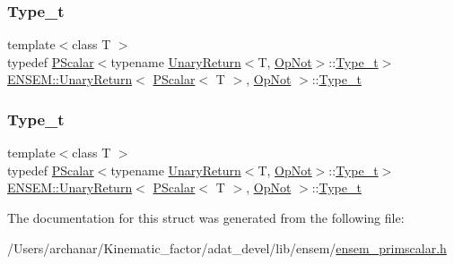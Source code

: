 \subsubsection{\texorpdfstring{Type\_t}{Type\_t}\hspace{0.1cm}{\footnotesize\ttfamily [1/2]}}
{\footnotesize\ttfamily template$<$class T $>$ \\
typedef \mbox{\hyperlink{classENSEM_1_1PScalar}{P\+Scalar}}$<$typename \mbox{\hyperlink{structENSEM_1_1UnaryReturn}{Unary\+Return}}$<$T, \mbox{\hyperlink{structENSEM_1_1OpNot}{Op\+Not}}$>$\+::\mbox{\hyperlink{structENSEM_1_1UnaryReturn_3_01PScalar_3_01T_01_4_00_01OpNot_01_4_a7612702a79b74f223457b785dbd77b2b}{Type\+\_\+t}}$>$ \mbox{\hyperlink{structENSEM_1_1UnaryReturn}{E\+N\+S\+E\+M\+::\+Unary\+Return}}$<$ \mbox{\hyperlink{classENSEM_1_1PScalar}{P\+Scalar}}$<$ T $>$, \mbox{\hyperlink{structENSEM_1_1OpNot}{Op\+Not}} $>$\+::\mbox{\hyperlink{structENSEM_1_1UnaryReturn_3_01PScalar_3_01T_01_4_00_01OpNot_01_4_a7612702a79b74f223457b785dbd77b2b}{Type\+\_\+t}}}

\mbox{\label{structENSEM_1_1UnaryReturn_3_01PScalar_3_01T_01_4_00_01OpNot_01_4_a7612702a79b74f223457b785dbd77b2b}} 
\subsubsection{\texorpdfstring{Type\_t}{Type\_t}\hspace{0.1cm}{\footnotesize\ttfamily [2/2]}}
{\footnotesize\ttfamily template$<$class T $>$ \\
typedef \mbox{\hyperlink{classENSEM_1_1PScalar}{P\+Scalar}}$<$typename \mbox{\hyperlink{structENSEM_1_1UnaryReturn}{Unary\+Return}}$<$T, \mbox{\hyperlink{structENSEM_1_1OpNot}{Op\+Not}}$>$\+::\mbox{\hyperlink{structENSEM_1_1UnaryReturn_3_01PScalar_3_01T_01_4_00_01OpNot_01_4_a7612702a79b74f223457b785dbd77b2b}{Type\+\_\+t}}$>$ \mbox{\hyperlink{structENSEM_1_1UnaryReturn}{E\+N\+S\+E\+M\+::\+Unary\+Return}}$<$ \mbox{\hyperlink{classENSEM_1_1PScalar}{P\+Scalar}}$<$ T $>$, \mbox{\hyperlink{structENSEM_1_1OpNot}{Op\+Not}} $>$\+::\mbox{\hyperlink{structENSEM_1_1UnaryReturn_3_01PScalar_3_01T_01_4_00_01OpNot_01_4_a7612702a79b74f223457b785dbd77b2b}{Type\+\_\+t}}}



The documentation for this struct was generated from the following file\+:\begin{DoxyCompactItemize}
\item 
/\+Users/archanar/\+Kinematic\+\_\+factor/adat\+\_\+devel/lib/ensem/\mbox{\hyperlink{lib_2ensem_2ensem__primscalar_8h}{ensem\+\_\+primscalar.\+h}}\end{DoxyCompactItemize}
